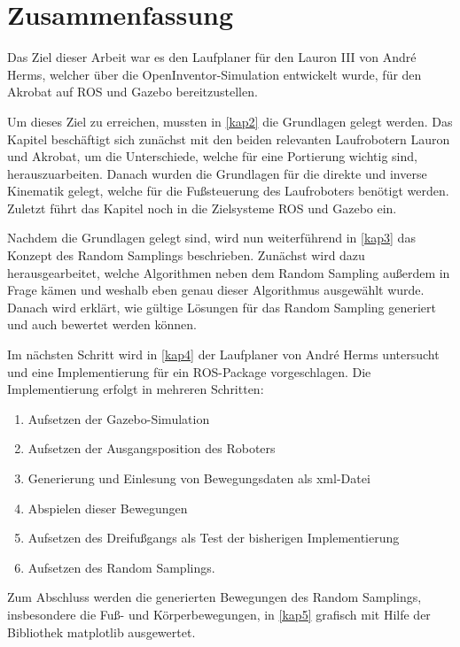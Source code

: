 \chapter{Zusammenfassung}
\label{kap6}

Das Ziel dieser Arbeit war es den Laufplaner für den Lauron III von André Herms, welcher über die OpenInventor-Simulation entwickelt wurde, für den Akrobat auf \ac{ROS} und Gazebo bereitzustellen.

Um dieses Ziel zu erreichen, mussten in \autoref{kap2} die Grundlagen gelegt werden. Das Kapitel beschäftigt sich zunächst mit den beiden relevanten Laufrobotern Lauron und Akrobat, um die Unterschiede, welche für eine  Portierung wichtig sind, herauszuarbeiten. Danach wurden die Grundlagen für die direkte und inverse Kinematik gelegt, welche für die Fußsteuerung des Laufroboters benötigt werden. Zuletzt führt das Kapitel noch in die Zielsysteme \acf{ROS} und Gazebo ein.

Nachdem die Grundlagen gelegt sind, wird nun weiterführend in \autoref{kap3} das Konzept des Random Samplings beschrieben. Zunächst wird dazu herausgearbeitet, welche Algorithmen neben dem Random Sampling außerdem in Frage kämen und weshalb eben genau dieser Algorithmus ausgewählt wurde. Danach wird erklärt, wie gültige Lösungen für das Random Sampling generiert und auch bewertet werden können.

Im nächsten Schritt wird in \autoref{kap4} der Laufplaner von André Herms untersucht und eine Implementierung für ein \ac{ROS}-Package vorgeschlagen. Die Implementierung erfolgt in mehreren Schritten:
\begin{enumerate}
\item Aufsetzen der Gazebo-Simulation
\item Aufsetzen der Ausgangsposition des Roboters
\item Generierung und Einlesung von Bewegungsdaten als xml-Datei
\item Abspielen dieser Bewegungen
\item Aufsetzen des Dreifußgangs als Test der bisherigen Implementierung
\item Aufsetzen des Random Samplings.
\end{enumerate}

Zum Abschluss werden die generierten Bewegungen des Random Samplings, insbesondere die Fuß- und Körperbewegungen, in \autoref{kap5} grafisch mit Hilfe der Bibliothek matplotlib ausgewertet.